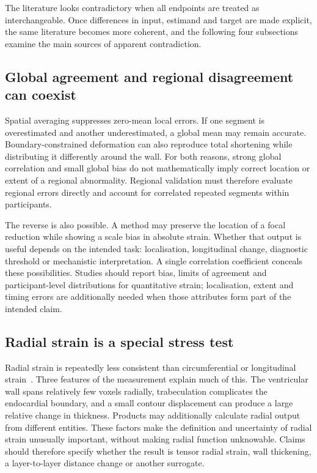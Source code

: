 The literature looks contradictory when all endpoints are treated as interchangeable. Once differences in input, estimand and target are made explicit, the same literature becomes more coherent, and the following four subsections examine the main sources of apparent contradiction.

\subsection{Global agreement and regional disagreement can coexist}

Spatial averaging suppresses zero-mean local errors. If one segment is overestimated and another underestimated, a global mean may remain accurate. Boundary-constrained deformation can also reproduce total shortening while distributing it differently around the wall. For both reasons, strong global correlation and small global bias do not mathematically imply correct location or extent of a regional abnormality. Regional validation must therefore evaluate regional errors directly and account for correlated repeated segments within participants.

The reverse is also possible. A method may preserve the location of a focal reduction while showing a scale bias in absolute strain. Whether that output is useful depends on the intended task: localisation, longitudinal change, diagnostic threshold or mechanistic interpretation. A single correlation coefficient conceals these possibilities. Studies should report bias, limits of agreement and participant-level distributions for quantitative strain; localisation, extent and timing errors are additionally needed when those attributes form part of the intended claim.

\subsection{Radial strain is a special stress test}

Radial strain is repeatedly less consistent than circumferential or longitudinal strain~\cite{cao2018,militaru2021}. Three features of the measurement explain much of this. The ventricular wall spans relatively few voxels radially, trabeculation complicates the endocardial boundary, and a small contour displacement can produce a large relative change in thickness. Products may additionally calculate radial output from different entities. These factors make the definition and uncertainty of radial strain unusually important, without making radial function unknowable. Claims should therefore specify whether the result is tensor radial strain, wall thickening, a layer-to-layer distance change or another surrogate.

